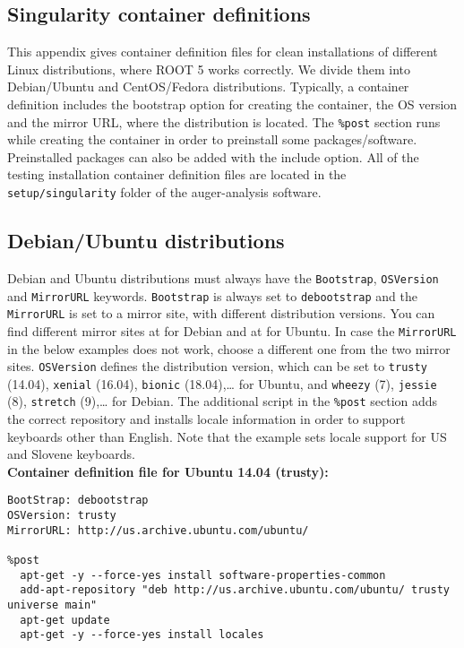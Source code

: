 \documentclass[12pt,a4paper]{report}
\begin{document}
\begin{appendices}
\chapter{Singularity container definitions} \label{app:containers}
{\noindent}This appendix gives container definition files for clean installations of different Linux distributions, where ROOT 5 works correctly. We divide them into Debian/Ubuntu and CentOS/Fedora distributions. Typically, a container definition includes the bootstrap option for creating the container, the OS version and the mirror URL, where the distribution is located. The \texttt{\%post} section runs while creating the container in order to preinstall some packages/software. Preinstalled packages can also be added with the include option. All of the testing installation container definition files are located in the \texttt{setup/singularity} folder of the auger-analysis software.

\section{Debian/Ubuntu distributions}
Debian and Ubuntu distributions must always have the \texttt{Bootstrap}, \texttt{OSVersion} and \texttt{MirrorURL} keywords. \texttt{Bootstrap} is always set to \texttt{debootstrap} and the \texttt{MirrorURL} is set to a mirror site, with different distribution versions. You can find different mirror sites at \cite{debianmirror} for Debian and at \cite{ubuntumirror} for Ubuntu. In case the \texttt{MirrorURL} in the below examples does not work, choose a different one from the two mirror sites. \texttt{OSVersion} defines the distribution version, which can be set to \texttt{trusty} (14.04), \texttt{xenial} (16.04), \texttt{bionic} (18.04),{\dots} for Ubuntu, and \texttt{wheezy} (7), \texttt{jessie} (8), \texttt{stretch} (9),{\dots} for Debian. The additional script in the \texttt{\%post} section adds the correct repository and installs locale information in order to support keyboards other than English. Note that the example sets locale support for US and Slovene keyboards.\\

{\noindent}\textbf{Container definition file for Ubuntu 14.04 (trusty):}
\begin{lstlisting}
BootStrap: debootstrap
OSVersion: trusty
MirrorURL: http://us.archive.ubuntu.com/ubuntu/

%post
  apt-get -y --force-yes install software-properties-common
  add-apt-repository "deb http://us.archive.ubuntu.com/ubuntu/ trusty universe main"
  apt-get update
  apt-get -y --force-yes install locales
  

\end{lstlisting}
\end{appendices}
\end{document}
